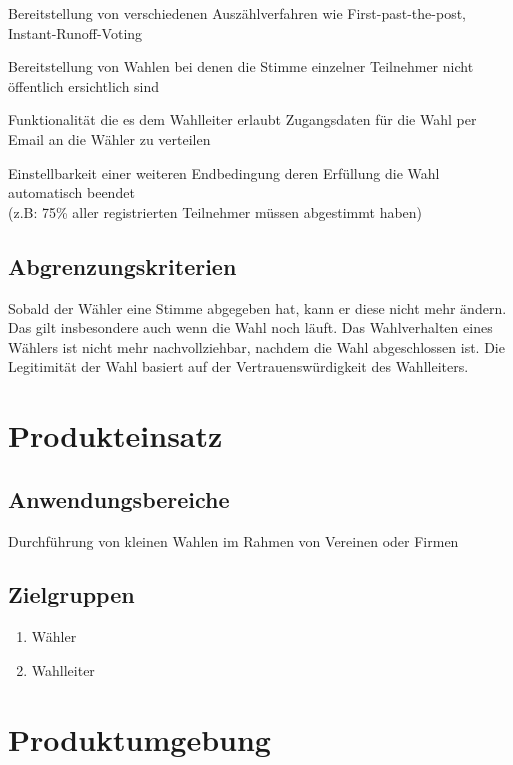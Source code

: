\documentclass[parskip=full,11pt,twoside]{scrartcl}
\begin{document}
Bereitstellung von verschiedenen Auszählverfahren wie First-past-the-post, Instant-Runoff-Voting

Bereitstellung von Wahlen bei denen die Stimme einzelner Teilnehmer nicht öffentlich ersichtlich sind

Funktionalität die es dem Wahlleiter erlaubt Zugangsdaten für die Wahl per Email an die Wähler zu verteilen

Einstellbarkeit einer weiteren Endbedingung deren Erfüllung die Wahl automatisch beendet \\(z.B: 75\% aller registrierten Teilnehmer müssen abgestimmt haben)

\subsection{Abgrenzungskriterien}
Sobald der Wähler eine Stimme abgegeben hat, kann er diese nicht mehr ändern. Das gilt insbesondere auch wenn die Wahl noch läuft.
Das Wahlverhalten eines Wählers ist nicht mehr nachvollziehbar, nachdem die Wahl abgeschlossen ist.
Die Legitimität der Wahl basiert auf der Vertrauenswürdigkeit des Wahlleiters.
\section{Produkteinsatz}

\subsection{Anwendungsbereiche}
Durchführung von kleinen Wahlen im Rahmen von Vereinen oder Firmen

\subsection{Zielgruppen}
\begin{enumerate}
  \item Wähler
  \item Wahlleiter
\end{enumerate}

\section{Produktumgebung}
\end{document}
